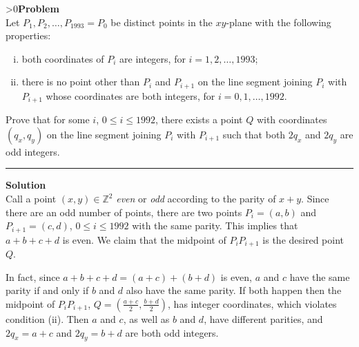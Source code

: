 \documentclass[12pt,oneside,a4paper]{book}
\newcounter{probnum}
\newcounter{solnum}
\newcommand{\prob}{\ifnum\value{probnum}>0\newpage\fi\setcounter{solnum}{0}\stepcounter{probnum}\textbf{Problem \theprobnum}\\}
\newcommand{\sol}{\medskip\hrule\medbreak\textbf{Solution}\\}
\begin{document}
\prob Let $P_1,P_2,\ldots,P_{1993}=P_0$ be distinct points in the $xy$-plane with the following properties:
\begin{enumerate}[(i)]
\item both coordinates of $P_i$ are integers, for $i=1,2,\ldots,1993$;
\item there is no point other than $P_i$ and $P_{i+1}$ on the line segment joining $P_i$ with $P_{i+1}$ whose coordinates are both integers, for $i=0,1,\ldots,1992$.
\end{enumerate}

Prove that for some $i$, $0\le i\le 1992$, there exists a point $Q$ with coordinates $(q_x,q_y)$ on the line segment joining $P_i$ with $P_{i+1}$ such that both $2q_x$ and $2q_y$ are odd integers.

\sol
Call a point $(x,y)\in\mathbb{Z}^2$ \emph{even} or \emph{odd} according to the parity of $x+y$. Since there are an odd number of points, there are two points $P_i = (a,b)$ and $P_{i+1} = (c,d)$, $0\le i\le 1992$ with the same parity. This implies that $a+b+c+d$ is even. We claim that the midpoint of $P_iP_{i+1}$ is the desired point $Q$.

In fact, since $a+b+c+d=(a+c)+(b+d)$ is even, $a$ and $c$ have the same parity if and only if $b$ and $d$ also have the same parity. If both happen then the midpoint of $P_iP_{i+1}$, $Q=\left(\frac{a+c}2,\frac{b+d}2\right)$, has integer coordinates, which violates condition (ii). Then $a$ and $c$, as well as $b$ and $d$, have different parities, and $2q_x=a+c$ and $2q_y=b+d$ are both odd integers.
\end{document}

